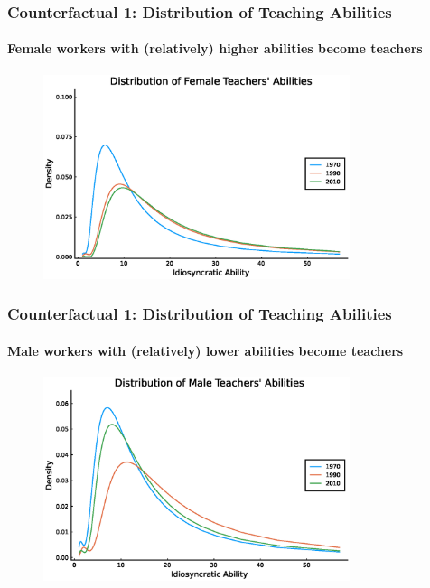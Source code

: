 \documentclass[11pt]{beamer}
\begin{document}
\begin{frame}
\frametitle{Counterfactual 1: Distribution of Teaching Abilities}
\framesubtitle{Female workers with (relatively) higher abilities become teachers}
\label{counter_femaleabil}
\begin{figure}
 \begin{center}
\includegraphics[width=0.8\textwidth]{fT_women_steadystate_counter3.eps}
 			\label{ }
 		\end{center}
 	\end{figure}
   \hyperlink{count}{} \hyperlink{base_femaleabil}{}
\end{frame}

\begin{frame}
\frametitle{Counterfactual 1: Distribution of Teaching Abilities}
\framesubtitle{Male workers with (relatively) lower abilities become teachers}
\label{counter_maleabil}
\begin{figure}
 \begin{center}
\includegraphics[width=0.8\textwidth]{fT_men_steadystate_counter3.eps}
 			\label{ }
 		\end{center}
 	\end{figure}
   \hyperlink{count}{} \hyperlink{base_maleabil}{}
\end{frame}
\end{document}
